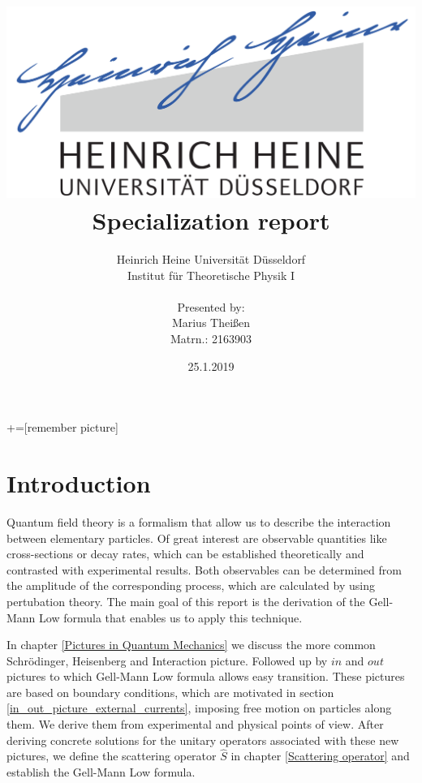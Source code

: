 \documentclass[12pt, titlepage]{article}
\title{\includegraphics[scale=0.07]{logo}\\Specialization report}
\date{25.1.2019}
\author{ Heinrich Heine Universit\"at D\"usseldorf\\ Institut f\"ur Theoretische Physik I\\  \\Presented by:\\Marius Thei\ss{}en\\ Matrn.: 2163903 \\  }
\begin{document}
+=[remember picture]
\everymath{\displaystyle}

\maketitle %
\tableofcontents
\newpage
\section{Introduction}\label{Introduction}
Quantum field theory is a formalism that allow us to describe the interaction between elementary particles. Of great interest are observable quantities like cross-sections or decay rates, which can be established theoretically and contrasted with experimental results. Both observables can be determined from the amplitude of the corresponding process, which are calculated by using pertubation theory. The main goal of this report is the derivation of the Gell-Mann Low formula that enables us  to apply this technique.
 
In chapter \ref{Pictures in Quantum Mechanics} we discuss the more common Schrödinger, Heisenberg and Interaction picture. Followed up by $ in $ and $ out $ pictures to which Gell-Mann Low formula allows easy transition. These pictures are based on boundary conditions, which are motivated in section \ref{in_out_picture_external_currents}, imposing free motion on particles along them. We derive them from experimental and physical points of view. After deriving concrete solutions for the unitary operators associated with these new pictures, we define the scattering operator $ \hat{S} $ in chapter \ref{Scattering operator} and establish the Gell-Mann Low formula.
\end{document}
